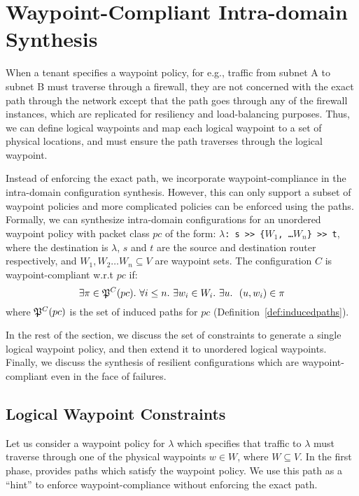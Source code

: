 \section{Waypoint-Compliant Intra-domain Synthesis}
When a tenant specifies a waypoint policy, for e.g., traffic from
subnet A to subnet B must traverse through a firewall, they are not
concerned with the exact path through the network except that the 
path goes through any of the firewall instances, which are replicated 
for resiliency and load-balancing purposes. Thus, we can define 
logical waypoints and map each logical waypoint to a set of physical
locations, and \name must ensure the path traverses through the logical waypoint.

Instead of enforcing the
exact \genesis path, we incorporate waypoint-compliance in the 
intra-domain configuration synthesis. However, this can only 
support a subset of waypoint policies and more complicated policies
can be enforced using the \genesis paths. 
Formally, we can synthesize intra-domain configurations
for an unordered waypoint policy with packet class $pc$ of the form: 
\texttt{$\lambda$: s >> \{$W_1$, \ldots $W_n$\} >> t},
where the destination is $\lambda$,  
$s$ and $t$ are the source and destination router respectively, 
and $W_1, W_2 \ldots W_n \subseteq V$ are waypoint sets.
The configuration $C$ is waypoint-compliant w.r.t $pc$ if: 
\[
\exists \pi \in \mathfrak{P}^C(pc). ~\forall i \leq n. ~\exists w_i \in W_i. 
~\exists u. ~~(u, w_i) \in \pi 
\]
where $\mathfrak{P}^C(pc)$ is the set of induced paths for 
$pc$ (Definition~\ref{def:inducedpaths}). 

In the rest of the section, we discuss the set of constraints
to generate a single logical waypoint policy, and then extend it 
to unordered logical waypoints. Finally, we discuss the synthesis
of resilient configurations which are waypoint-compliant even in 
the face of failures. 

\subsection{Logical Waypoint Constraints}
Let us consider a waypoint policy for $\lambda$ which
specifies that traffic to $\lambda$ must traverse through
one of the physical waypoints $w \in W$, where $W \subseteq V$.
In the first phase, \genesis provides paths which
satisfy the waypoint policy. We use this path as a 
``hint'' to enforce waypoint-compliance without 
enforcing the exact path. 

